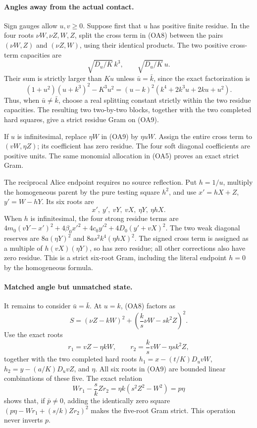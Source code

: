 \paragraph{Angles away from the actual contact.}
Sign gauges allow $u,v\geq0$. Suppose first that $u$ has positive
finite residue. In the four roots
$\nu W,\nu Z,W,Z$, split the cross term in (OA8) between the pairs
$(\nu W,Z)$ and $(\nu Z,W)$, using their identical products.
The two positive cross-term capacities are
\[
 \sqrt{D_u/K}\,k^3,\qquad \sqrt{D_u/K}\,u.
\]
Their sum is strictly larger than $Ku$ unless $\bar u=\bar k$, since
the exact factorization is
\[
 (1+u^2)(u+k^3)^2-K^3u^2
  =(u-k)^2(k^4+2k^3u+2ku+u^2).                         \tag{OA10}
\]
Thus, when $\bar u\ne\bar k$, choose a real splitting constant
strictly within the two residue capacities. The resulting two
two-by-two blocks, together with the two completed hard squares,
give a strict residue Gram on (OA9).

If $u$ is infinitesimal, replace $\eta W$ in (OA9) by $\eta uW$.
Assign the entire cross term to $(vW,\eta Z)$; its coefficient has
zero residue. The four soft diagonal coefficients are positive units.
The same monomial allocation in (OA5) proves an exact strict Gram.

The reciprocal Alice endpoint requires no source reflection. Put
$h=1/u$, multiply the homogeneous parent by the pure testing square
$h^2$, and use $x'=hX+Z$, $y'=W-hY$. Its six roots are
\[
                 x',\ y',\ vY,\ vX,\ \eta Y,\ \eta hX.
                                                        \tag{OA11}
\]
When $h$ is infinitesimal, the four strong residue terms are
$4m_0(vY-x')^2+4\beta_0x'^2+4c_0y'^2+4D_0(y'+vX)^2$.
The two weak diagonal reserves are $8a(\eta Y)^2$ and
$8as^2k^4(\eta hX)^2$. The signed cross term is assigned as a
multiple of $h(vX)(\eta Y)$, so has zero residue; all other corrections
also have zero residue. This is a strict six-root Gram, including
the literal endpoint $h=0$ by the homogeneous formula.

\paragraph{Matched angle but unmatched state.}
It remains to consider $\bar u=\bar k$. At $u=k$, (OA8) factors as
\[
 S=(\nu Z-kW)^2+
       \left(\frac{k}{s}\nu W-sk^2Z\right)^2.          \tag{OA12}
\]
Use the exact roots
\[
 r_1=vZ-\eta kW,\qquad
 r_2=\frac{k}{s}vW-\eta sk^2Z,
\]
together with the two completed hard roots
$h_1=x-(t/K)D_uvW$, $h_2=y-(a/K)D_uvZ$, and $\eta$.
All six roots in (OA9) are bounded linear combinations of these five.
The exact relation
\[
 Wr_1-\frac{s}{k}Zr_2
   =\eta k(s^2Z^2-W^2)=p\eta                         \tag{OA13}
\]
shows that, if $\bar p\ne0$, adding the identically zero square
$(p\eta-Wr_1+(s/k)Zr_2)^2$ makes the five-root Gram strict.
This operation never inverts $p$.

